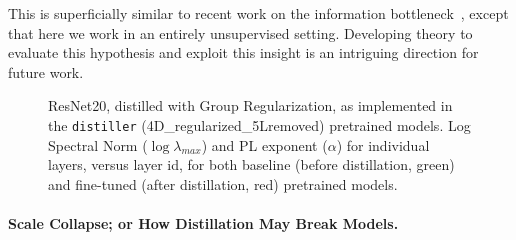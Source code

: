 This is superficially similar to recent work on the information bottleneck~\cite{ST17_TR}, except that here we work in an entirely unsupervised setting.
Developing theory to evaluate this hypothesis and exploit this insight is an intriguing direction for future work.

\begin{figure}[t]
   \centering
   \qquad
   \caption{%
            ResNet20, distilled with Group Regularization, as implemented in the \texttt{distiller} (4D\_regularized\_5Lremoved) pretrained models.  
            Log Spectral Norm ($\log\lambda_{max}$) and PL exponent ($\alpha$) for individual layers, versus layer id, for both baseline (before distillation, green) and fine-tuned (after distillation, red) pretrained models. 
           }
   \label{fig:resnet204D5L}
\end{figure}


\vspace{-1mm}
\paragraph{Scale Collapse; or How Distillation May Break Models.}

